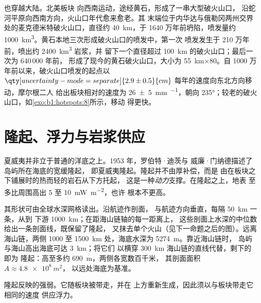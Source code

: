 也穿越大陆。北美板块
向西南运动，途经黄石，形成了一串大型破火山口，
沿蛇河平原向西南方向，火山口年代愈来愈老。其
末端位于内华达与俄勒冈两州交界处的麦克德米特破火山口，直径约
\qty{40}{km}，于 1640 万年前坍陷，喷发量约
\qty{1000}{km^3}。黄石本地三次形成破火山口的喷发中，第一次
喷发发生于 210 万年前，喷出约 \qty{2400}{km^3} 岩浆，并
留下一个直径超过 \qty{100}{km} 的破火山口；最后一次为 640\,000 年前，
形成了现今的黄石破火山口，大小为 \qty{55}{km}×80。自 1000 万
年前以来，破火山口喷发的起点以
$\qty[uncertainty-mode=separate]{2.9 \pm 0.5}{cm}$ 每年的速度向东北方向移动，摩尔根二人
给出板块相对的速度为
\qty[uncertainty-mode=separate]{26 \pm 5}{mm.^{-1}}，朝向
\ang{235}；较老的破火山口，如\cref{exo:b1:hotspots:8}所示，移动
得更快。

\section{隆起、浮力与岩浆供应}\label{sec:b1:hotspots:swells}

夏威夷并非立于普通的洋底之上。1953 年，罗伯特·迪茨与
威廉·门纳德描述了岛屿所在海底的宽缓隆起，
即夏威夷隆起。隆起并不由厚补偿，而是
由在板块之下铺展时的热而轻的岩石从下方托起，
这是一种\emph{动力}支撑。在隆起之上，地表
至多比周围高出 5 至 \qty{10}{mW.m^{-2}}，也许
根本不更高。

其形状可由全球水深网格读出。沿航迹作剖面，
与航迹方向垂直，每隔 \qty{50}{km} 一条，从到
下游 \qty{1000}{km}；在距海山链轴的每一距离上，
这些剖面上水深的中位数给出一条剖面线，既保留了隆起，
又抹去单个火山（见下一命题之后的图）。远离海山链，两侧
1000 至 \qty{1500}{km} 处，海底水深为 \qty{5274}{m}。靠近海山链时，
岛屿与海山高出海底可达 \qty{3}{km}；将它们
以横穿 \qty{300}{km} 海山链的直线代替，剩下的即为
隆起：高至多约 \qty{690}{m}，两侧各宽数百千米，
其剖面面积 $A \approx \qty{4.8e8}{m^2}$，
以远处海底为基准。

隆起反映的强弱。它随板块被带走，并在
上方重新生成，因此须以与板块带走它相同的速度
供应浮力。

